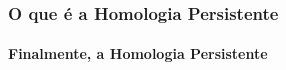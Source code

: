 \documentclass[11pt]{beamer}
\begin{document}
    \begin{frame}
        \frametitle{O que é a Homologia Persistente}
        \framesubtitle{Finalmente, a Homologia Persistente}
        
    \end{frame}
    


%
%
%
\end{document}
